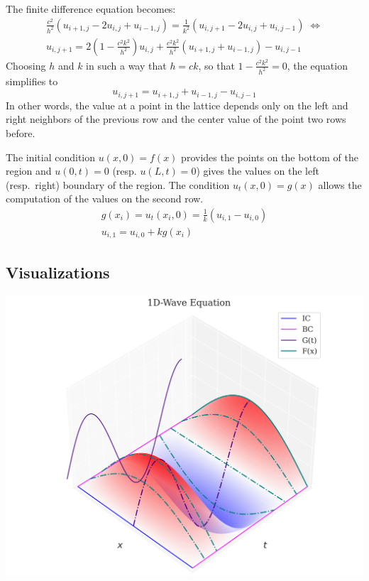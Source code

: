 The finite difference equation becomes:
\begin{gather*}
    \frac{c^2}{h^2}(u_{i+1,j}-2u_{i,j}+u_{i-1,j})=\frac{1}{k^2}(u_{i,j+1}-2u_{i,j}+u_{i,j-1}) \; \Leftrightarrow \\
    u_{i,j+1}=2\left(1-\frac{c^2k^2}{h^2}\right)u_{i,j}+\frac{c^2k^2}{h^2}(u_{i+1,j}+u_{i-1,j})-u_{i,j-1}
\end{gather*}
Choosing $h$ and $k$ in such a way that $h=ck$, so that $1 - \frac{c^2k^2}{h^2} = 0$, the equation simplifies to
\begin{equation*}
    u_{i,j+1}=u_{i+1,j}+u_{i-1,j}-u_{i,j-1}
\end{equation*}
In other words, the value at a point in the lattice depends only on the left and right neighbors of the previous row and the center value of the point two rows before.

The initial condition $u(x, 0) = f(x)$ provides the points on the bottom of the region and $u(0, t) = 0$ (resp. $u(L, t) = 0$) gives the values on the left (resp.\ right) boundary of the region. The condition $u_t(x, 0) = g(x)$ allows the computation of the values on the second row.
\begin{gather*}
    g(x_i)=u_t(x_i,0)=\frac{1}{k}(u_{i,1}-u_{i,0}) \\
    u_{i,1}=u_{i,0}+kg(x_i)
\end{gather*}

\subsection{Visualizations}

\includegraphics[width=0.85\linewidth]{../images/1d_wave.png}

